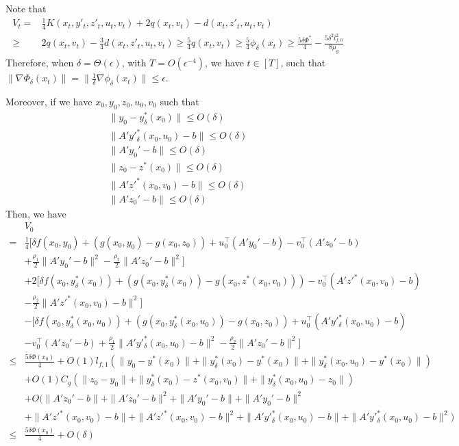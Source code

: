 \documentclass{article}
\theoremstyle{plain}
\theoremstyle{definition}
\theoremstyle{remark}
\begin{document}
Note that 
\begin{align*}
    V_t=&\frac{1}{4}K(x_t, y'_t, z'_t, u_t, v_t)+2q(x_t,v_t)-d(x_t,z'_t, u_t, v_t)\\
    \geq& 2q(x_t,v_t)-\frac{3}{4}d(x_t,z'_t, u_t, v_t)\geq \frac{5}{4}q(x_t,v_t)\geq \frac{5}{4}\phi_\delta(x_t)\geq \frac{5\delta\Phi^*}{4}-\frac{5\delta^2 l^2_{f,0}}{8\mu_g}
\end{align*}
Therefore, when $\delta=\Theta(\epsilon)$, with $T=O(\epsilon^{-4})$, we have $t\in[T]$, such that $\|\nabla \Phi_\delta(x_{t})\|=\|\frac{1}{\delta}\nabla \phi_\delta(x_{t})\|\leq \epsilon$.


Moreover, if we have $x_0, y_0, z_0, u_0, v_0$ such that
\begin{align*}
        \|y_0-y^*_\delta(x_0)\|\leq O(\delta)\\
        \|A'y'^*_\delta(x_0,u_0)-b\|\leq O(\delta)\\
        \|A'y_0'-b\|\leq O(\delta)\\
        \|z_0-z^*(x_0)\|\leq O(\delta)\\
        \|A'z'^*(x_0,v_0)-b\|\leq O(\delta)\\
        \|A'z_0'-b\|\leq O(\delta)
\end{align*}
Then, we have
    \begin{align*}
        &V_0\\
        =&\frac{1}{4}\bigg[\delta f(x_0, y_0)+ (g(x_0, y_0)-g(x_0, z_0))+u_0^\top(A'y_0'-b) -v_0^\top(A'z_0'-b)\\
        &+\frac{\rho_1}{2}\|A'y_0'-b\|^2-\frac{\rho_2}{2}\|A'z_0'-b\|^2\bigg]\\
        &+2\bigg[\delta f(x_0, y^*_\delta(x_0))+ (g(x_0, y^*_\delta(x_0))-g(x_0, z^*(x_0,v_0))) -v_0^\top(A'z'^*(x_0,v_0)-b)\\
        &-\frac{\rho_2}{2}\|A'z'^*(x_0,v_0)-b\|^2\bigg]\\
        &-\bigg[\delta f(x_0, y^*_\delta(x_0,u_0))+ (g(x_0, y^*_\delta(x_0,u_0))-g(x_0, z_0))+u_0^\top(A'y'^*_\delta(x_0,u_0)-b) \\
        &-v_0^\top(A'z_0'-b)+\frac{\rho_1}{2}\|A'y'^*_\delta(x_0,u_0)-b\|^2-\frac{\rho_2}{2}\|A'z_0'-b\|^2\bigg]\\
        \leq& \frac{5\delta \Phi(x_0)}{4}+O(1)l_{f,1}(\|y_0-y^*(x_0)\|+\|y^*_\delta(x_0)-y^*(x_0)\|+\|y^*_\delta(x_0,u_0)-y^*(x_0)\|)\\
        &+O(1)C_g(\|z_0-y_0\|+\|y^*_\delta(x_0)-z^*(x_0,v_0)\|+\|y^*_\delta(x_0,u_0)-z_0\|)\\
        &+O(\|A'z_0'-b\|+\|A'z_0'-b\|^2+\|A'y_0'-b\|+\|A'y_0'-b\|^2\\
        &+\|A'z'^*(x_0,v_0)-b\|+\|A'z'^*(x_0,v_0)-b\|^2+\|A'y'^*_\delta(x_0,u_0)-b\|+\|A'y'^*_\delta(x_0,u_0)-b\|^2)\\
        \leq&\frac{5\delta \Phi(x_0)}{4}+O(\delta)
    \end{align*}
\end{document}
